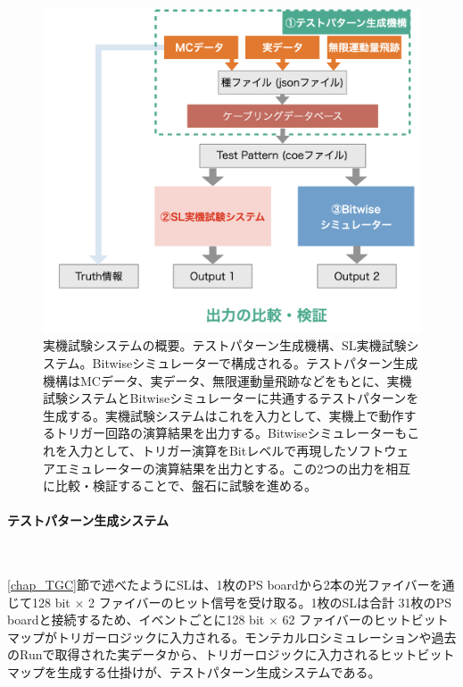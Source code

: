 \begin{figure} 
\centering
\includegraphics[width=16cm]{fig/Test/Test_system.png}
\caption[実機試験システムの概要]{実機試験システムの概要。テストパターン生成機構、SL実機試験システム。Bitwiseシミュレーターで構成される。テストパターン生成機構はMCデータ、実データ、無限運動量飛跡などをもとに、実機試験システムとBitwiseシミュレーターに共通するテストパターンを生成する。実機試験システムはこれを入力として、実機上で動作するトリガー回路の演算結果を出力する。Bitwiseシミュレーターもこれを入力として、トリガー演算をBitレベルで再現したソフトウェアエミュレーターの演算結果を出力とする。この2つの出力を相互に比較・検証することで、盤石に試験を進める。}
\label{Test_system}
\end{figure}

\paragraph{テストパターン生成システム}　　
\par
\ref{chap_TGC}節で述べたようにSLは、1枚のPS boardから2本の光ファイバーを通じて128 bit $\times$ 2 ファイバーのヒット信号を受け取る。1枚のSLは合計 31枚のPS boardと接続するため、イベントごとに128 bit $\times$ 62 ファイバーのヒットビットマップがトリガーロジックに入力される。モンテカルロシミュレーションや過去のRunで取得された実データから、トリガーロジックに入力されるヒットビットマップを生成する仕掛けが、テストパターン生成システムである。

